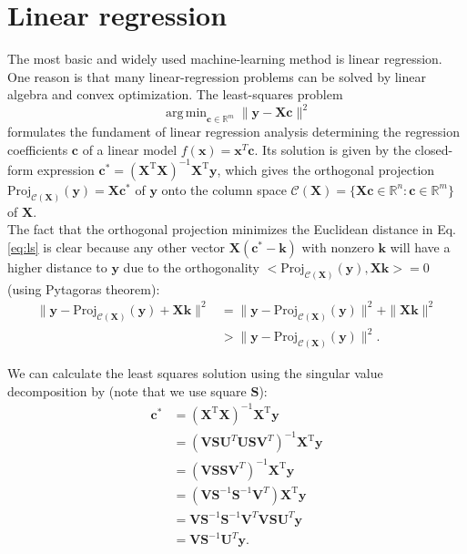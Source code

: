 \documentclass[11pt, a4paper, parskip=half*, bibliography=totoc, cleardoublepage=empty, final,
numbers=noenddot]{scrbook}
\DeclareMathOperator*{\argmin}{arg\,min}
\begin{document}
\section{Linear regression}
The most basic and widely used machine-learning method is linear regression. One reason is that many linear-regression problems can be solved by linear algebra and convex optimization. The least-squares problem
\begin{equation}
\argmin_{\bm{c} \in \mathbb{R}^m} \| \bm{y} - \bm{X} \bm{c} \|^2
\label{eq:ls}
\end{equation}
formulates the fundament of linear regression analysis determining the regression coefficients $\bm{c}$ of a linear model $f(\bm{x}) = \bm{x}^T \bm{c}$. Its solution is given by the closed-form expression $\bm{c}^* = (\bm{X}^\text{T}\bm{X})^{-1}\bm{X}^\text{T} \bm{y}$, which gives the orthogonal projection $\text{Proj}_{\mathcal{C}(\bm{X})}(\bm{y}) = \bm{X} \bm{c}^*$ of $\bm{y}$ onto the column space $\mathcal{C}(\bm{X}) = \{ \bm{X} \bm{c} \in \mathbb{R}^n  : \bm{c} \in \mathbb{R}^m \}$ of $\bm{X}$.\\ 
The fact that the orthogonal projection minimizes the Euclidean distance in Eq. \ref{eq:ls} is clear because any other vector $\bm{X} (\bm{c}^* - \bm{k})$ with nonzero $\bm{k}$ will have a higher distance to $\bm{y}$ due to the orthogonality \mbox{$<\text{Proj}_{\mathcal{C}(\bm{X})}(\bm{y}), \bm{X} \bm{k}> = 0$} (using Pytagoras theorem):
\begin{align}
\| \bm{y} -  \text{Proj}_{\mathcal{C}(\bm{X})}(\bm{y}) +\bm{X}\bm{k}\|^2 &= \| \bm{y} -  \text{Proj}_{\mathcal{C}(\bm{X})}(\bm{y}) \|^2 + \| \bm{X}\bm{k} \|^2 \\
&> \| \bm{y} -  \text{Proj}_{\mathcal{C}(\bm{X})}(\bm{y}) \|^2.
\end{align}

We can calculate the least squares solution using the singular value decomposition by (note that we use square $\bm{S}$):
\begin{align}
\bm{c}^* &= (\bm{X}^\text{T}\bm{X})^{-1}\bm{X}^\text{T} \bm{y} \\
&= (\bm{V} \bm{S} \bm{U}^T \bm{U} \bm{S} \bm{V}^T)^{-1}\bm{X}^\text{T} \bm{y}\\
&= (\bm{V} \bm{S}\bm{S} \bm{V}^T)^{-1}\bm{X}^\text{T} \bm{y}\\
&= (\bm{V} \bm{S}^{-1}\bm{S}^{-1} \bm{V}^T )\bm{X}^\text{T} \bm{y}\\
&= \bm{V} \bm{S}^{-1}\bm{S}^{-1} \bm{V}^T \bm{V} \bm{S} \bm{U}^T \bm{y} \\
&= \bm{V} \bm{S}^{-1} \bm{U}^T \bm{y}. 
\label{eq:ls-svd}
\end{align}
\end{document}
